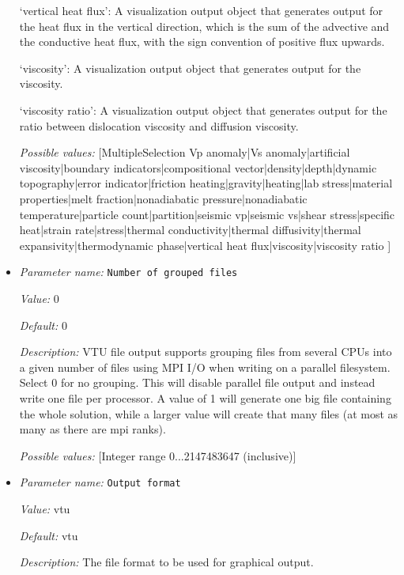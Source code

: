 \begin{itemize}
`vertical heat flux': A visualization output object that generates output for the heat flux in the vertical direction, which is the sum of the advective and the conductive heat flux, with the sign convention of positive flux upwards.

`viscosity': A visualization output object that generates output for the viscosity.

`viscosity ratio': A visualization output object that generates output for the ratio between dislocation viscosity and diffusion viscosity.


{\it Possible values:} [MultipleSelection Vp anomaly|Vs anomaly|artificial viscosity|boundary indicators|compositional vector|density|depth|dynamic topography|error indicator|friction heating|gravity|heating|lab stress|material properties|melt fraction|nonadiabatic pressure|nonadiabatic temperature|particle count|partition|seismic vp|seismic vs|shear stress|specific heat|strain rate|stress|thermal conductivity|thermal diffusivity|thermal expansivity|thermodynamic phase|vertical heat flux|viscosity|viscosity ratio ]
\item {\it Parameter name:} {\tt Number of grouped files}
\label{parameters:Postprocess/Visualization/Number of grouped files}


{\it Value:} 0


{\it Default:} 0


{\it Description:} VTU file output supports grouping files from several CPUs into a given number of files using MPI I/O when writing on a parallel filesystem. Select 0 for no grouping. This will disable parallel file output and instead write one file per processor. A value of 1 will generate one big file containing the whole solution, while a larger value will create that many files (at most as many as there are mpi ranks).


{\it Possible values:} [Integer range 0...2147483647 (inclusive)]
\item {\it Parameter name:} {\tt Output format}
\label{parameters:Postprocess/Visualization/Output format}


{\it Value:} vtu


{\it Default:} vtu


{\it Description:} The file format to be used for graphical output.



\end{itemize}
